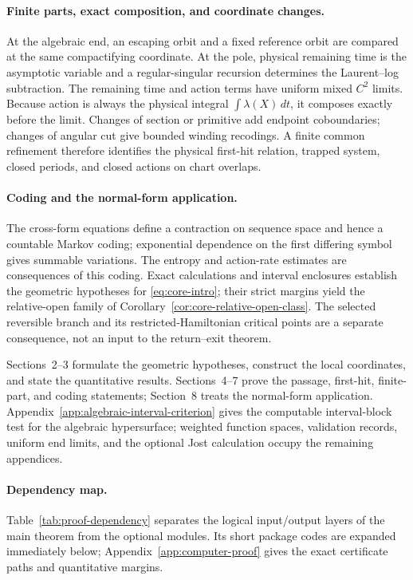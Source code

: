 \documentclass[11pt]{amsart}
\numberwithin{equation}{section}
\theoremstyle{definition}
\theoremstyle{remark}
\begin{document}
\paragraph{Finite parts, exact composition, and coordinate changes.}
At the algebraic end, an escaping orbit and a fixed reference orbit are
compared at the same compactifying coordinate.  At the pole, physical
remaining time is the asymptotic variable and a regular-singular recursion
determines the Laurent--log subtraction.  The remaining time and action
terms have uniform mixed $C^2$ limits.  Because action is always the
physical integral $\int\lambda(X)\,dt$, it composes exactly before the
limit.  Changes of section or primitive add endpoint coboundaries; changes
of angular cut give bounded winding recodings.  A finite common refinement
therefore identifies the physical first-hit relation, trapped system,
closed periods, and closed actions on chart overlaps.

\paragraph{Coding and the normal-form application.}
The cross-form equations define a contraction on sequence space and hence
a countable Markov coding; exponential dependence on the first differing
symbol gives summable variations.  The entropy and action-rate estimates
are consequences of this coding.  Exact calculations and interval
enclosures establish the geometric hypotheses for
\eqref{eq:core-intro}; their strict margins yield the relative-open family
of Corollary~\ref{cor:core-relative-open-class}.  The selected reversible
branch and its restricted-Hamiltonian critical points are a separate
consequence, not an input to the return--exit theorem.

Sections~2--3 formulate the geometric hypotheses, construct the local
coordinates, and state the quantitative results.  Sections~4--7 prove the
passage, first-hit, finite-part, and coding statements; Section~8 treats the
normal-form application.  Appendix~\ref{app:algebraic-interval-criterion}
gives the computable interval-block test for the algebraic hypersurface;
weighted function spaces, validation records, uniform end limits, and the
optional Jost calculation occupy the remaining appendices.

\paragraph{Dependency map.}
Table~\ref{tab:proof-dependency} separates the logical input/output layers
of the main theorem from the optional modules.  Its short package codes are
expanded immediately below; Appendix~\ref{app:computer-proof} gives the
exact certificate paths and quantitative margins.
\end{document}
